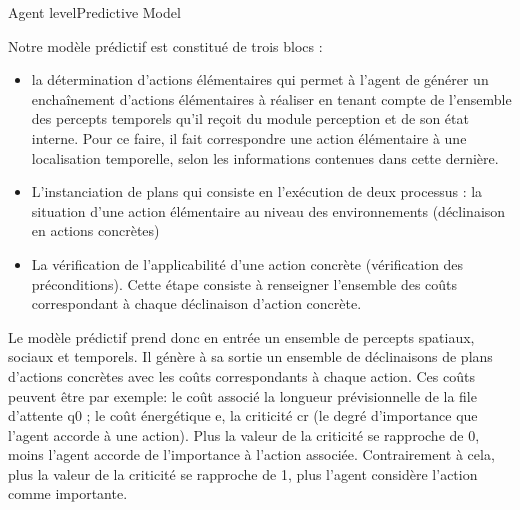 \begin{frame}{Agent level}{Predictive Model}
{Notre modèle prédictif est constitué de trois blocs :
\begin{itemize}
    \item la détermination d’actions élémentaires qui permet à l’agent de générer un enchaînement d’actions élémentaires à réaliser en tenant compte de l’ensemble des percepts temporels qu’il reçoit du module perception et de son état interne. Pour ce faire, il fait correspondre une action élémentaire à une localisation temporelle, selon les informations contenues dans cette dernière.
    \item L’instanciation de plans qui consiste en l’exécution de deux processus : la situation d’une action élémentaire au niveau des environnements (déclinaison en actions concrètes)
    \item La vérification de l’applicabilité d’une action concrète (vérification des préconditions). Cette étape consiste à renseigner l’ensemble des coûts correspondant à chaque déclinaison d’action concrète.
\end{itemize}
Le modèle prédictif prend donc en entrée un ensemble de percepts spatiaux, sociaux et temporels. Il génère à sa sortie un ensemble de déclinaisons de plans d’actions concrètes avec les coûts correspondants à chaque action.
Ces coûts peuvent être par exemple: le coût associé la longueur prévisionnelle de la file d’attente q0 ; le coût énergétique e, la criticité cr (le degré d’importance que l’agent accorde à une action). Plus la valeur de la criticité se rapproche de 0, moins l’agent accorde de l’importance à l’action associée. Contrairement à cela, plus la valeur de la criticité se rapproche de 1, plus l’agent considère l’action comme importante.


}
    
\end{frame}

